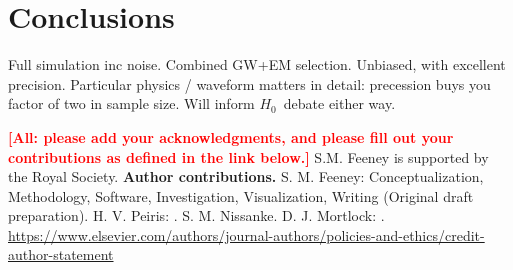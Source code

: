 \documentclass[%
 reprint,
 superscriptaddress,
 nofootinbib,
 amsmath,amssymb,
 aps,
]{revtex4-2}
\newcommand{\hubble}{\ensuremath{H_0}}
\newcommand{\smf}[1]{\textcolor{red}{\bf [#1]}}
\begin{document}

\section{Conclusions} \label{sec:conclusions}
Full simulation inc noise. Combined GW+EM selection. Unbiased, with excellent precision. Particular physics / waveform matters in detail: precession buys you factor of two in sample size. Will inform \hubble\ debate either way.


\begin{acknowledgments}
\smf{All: please add your acknowledgments, and please fill out your contributions as defined in the link below.} S.M. Feeney is supported by the Royal Society.
{\bf Author contributions.} S. M. Feeney: Conceptualization, Methodology, Software, Investigation, Visualization, Writing (Original draft preparation). H. V. Peiris: . S. M. Nissanke. D. J. Mortlock: . \url{https://www.elsevier.com/authors/journal-authors/policies-and-ethics/credit-author-statement}
\end{acknowledgments}


\end{document}
